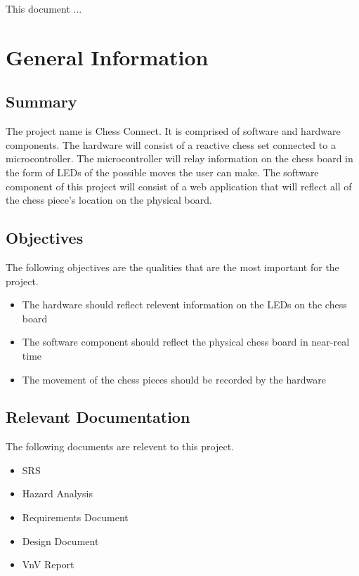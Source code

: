 \documentclass[12pt, titlepage]{article}
\begin{document}

This document ... 

\section{General Information}

\subsection{Summary}
The project name is Chess Connect. It is comprised of software and hardware components. The hardware will consist of a reactive chess set 
connected to a microcontroller. The microcontroller will relay information on the chess board in the form of LEDs of the possible moves the user can make.
The software component of this project will consist of a web application that will reflect all of the chess piece's location on the physical board.

\subsection{Objectives}
The following objectives are the qualities that are the most important for the project.
\begin{itemize}
  \item The hardware should reflect relevent information on the LEDs on the chess board
  \item The software component should reflect the physical chess board in near-real time
  \item The movement of the chess pieces should be recorded by the hardware
\end{itemize}

\subsection{Relevant Documentation}
The following documents are relevent to this project.
\begin{itemize}
  \item SRS
  \item Hazard Analysis
  \item Requirements Document
  \item Design Document
  \item VnV Report
\end{itemize}
\end{document}
